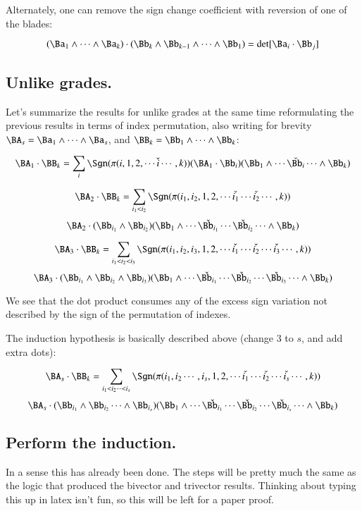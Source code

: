 Alternately, one can remove the sign change coefficient with reversion of one of the blades:

\begin{equation}\label{eqn:bladegradereduction:bladedothyprev}
(\Ba_1 \wedge \cdots \wedge \Ba_k) \cdot (\Bb_k \wedge \Bb_{k-1} \wedge \cdots \wedge \Bb_1) = \det[\Ba_i \cdot \Bb_j]
\end{equation}

\subsection{Unlike grades. }

Let's summarize the results for unlike grades at the same time reformulating the previous results in terms of index
permutation, also writing for brevity $\BA_s = \Ba_1 \wedge \cdots \wedge \Ba_s$, and $\BB_k = \Bb_1 \wedge \cdots \wedge \Bb_k$:

\[
\BA_1 \cdot \BB_k =
\sum_i \Sgn(\pi(i,1,2,\cdots\check{i}\cdots,k)) (\BA_1 \cdot \Bb_i) (\Bb_1 \wedge \cdots \check{\Bb_i} \cdots \wedge \Bb_k) 
\]

\[
\BA_2 \cdot \BB_k =
\sum_{i_1<i_2} \Sgn(\pi(i_1,i_2,1,2,\cdots\check{i_1}\cdots\check{i_2}\cdots,k)) 
\]
\[
   \BA_2 \cdot (\Bb_{i_1} \wedge \Bb_{i_2})
   (\Bb_1 \wedge \cdots \check{\Bb_{i_1}} \cdots \check{\Bb_{i_2}} \cdots \wedge \Bb_k)
\]

\[
\BA_3 \cdot \BB_k =
\sum_{i_1<i_2<i_3} \Sgn(\pi(i_1,i_2,i_3,1,2,\cdots\check{i_1}\cdots\check{i_2}\cdots\check{i_3}\cdots,k)) 
\]
\[
\BA_3 \cdot (\Bb_{i_1} \wedge \Bb_{i_2} \wedge \Bb_{i_3})
(\Bb_1 \wedge \cdots \check{\Bb_{i_1}} \cdots \check{\Bb_{i_2}} \cdots \check{\Bb_{i_3}} \cdots \wedge \Bb_k) 
\]

We see that the dot product consumes any of the excess sign variation not described by the sign of the permutation of indexes.

The induction hypothesis is basically described above (change $3$ to $s$, and add extra dots):

\begin{equation*}
\BA_s \cdot \BB_k =
\sum_{i_1<i_2\cdots<i_s} \Sgn(\pi(i_1,i_2\cdots,i_s,1,2,\cdots\check{i_1}\cdots\check{i_2}\cdots\check{i_s}\cdots,k)) 
\end{equation*}
\begin{equation}\label{eqn:bladegradereduction:inductionbigdotblade}
\BA_s \cdot (\Bb_{i_1} \wedge \Bb_{i_2} \cdots \wedge \Bb_{i_s})
(\Bb_1 \wedge \cdots \check{\Bb_{i_1}} \cdots \check{\Bb_{i_2}} \cdots \check{\Bb_{i_s}} \cdots \wedge \Bb_k) 
\end{equation}

\subsection{Perform the induction. }

In a sense this has already been done.  The steps will be pretty much the same as the logic that produced the bivector and trivector 
results.  Thinking about typing this up in latex isn't fun, so this will be left for a paper proof.
